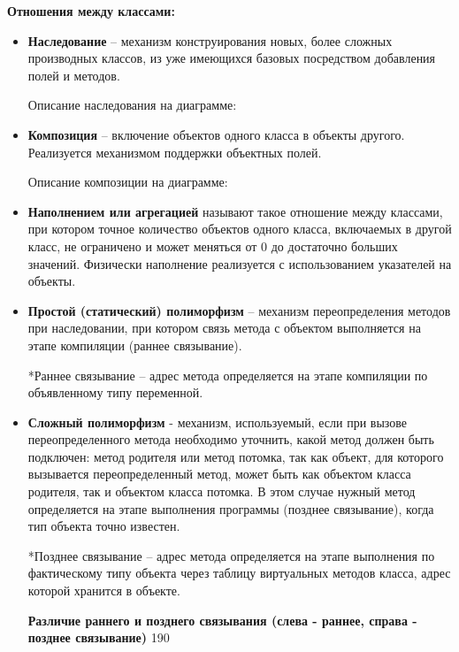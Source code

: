 \noindent
{\bf{Отношения между классами:}}
\begin{itemize}
\item{\bf {Наследование}} – механизм конструирования новых, более сложных производных классов, из уже имеющихся базовых посредством добавления полей и методов. 

\noindent
Описание наследования на диаграмме:

\vspace*{160pt}

\item{\bf {Композиция}} – включение объектов одного класса в объекты другого. Реализуется механизмом поддержки объектных полей.

\noindent
Описание композиции на диаграмме:

\item{\bf {Наполнением или агрегацией}} называют такое отношение между классами, при котором точное количество объектов одного класса, включаемых в 
другой класс, не ограничено и может меняться от 0 до достаточно больших 
значений. Физически наполнение реализуется с использованием указателей 
на объекты.



\item{\bf{Простой (статический) полиморфизм}} – механизм переопределения методов при наследовании, при котором связь метода с объектом выполняется на этапе компиляции (раннее связывание).

*Раннее связывание – адрес метода определяется на этапе компиляции по объявленному типу переменной.

\item {\bf{Сложный полиморфизм}} - механизм, используемый, если при вызове переопределенного метода необходимо уточнить, какой метод должен быть подключен: метод 
родителя или метод потомка, так как объект, для которого вызывается переопределенный метод, может быть как объектом класса родителя, так и объектом класса потомка. В этом случае нужный метод определяется на этапе выполнения программы (позднее связывание), когда тип объекта точно известен.

*Позднее связывание – адрес метода определяется на этапе выполнения по фактическому типу объекта через таблицу виртуальных методов класса, адрес которой хранится в объекте.

\newpage
\noindent
{\bf{Различие раннего и позднего связывания (слева - раннее, справа - позднее связывание)}}
 {190} 
\end{itemize}

